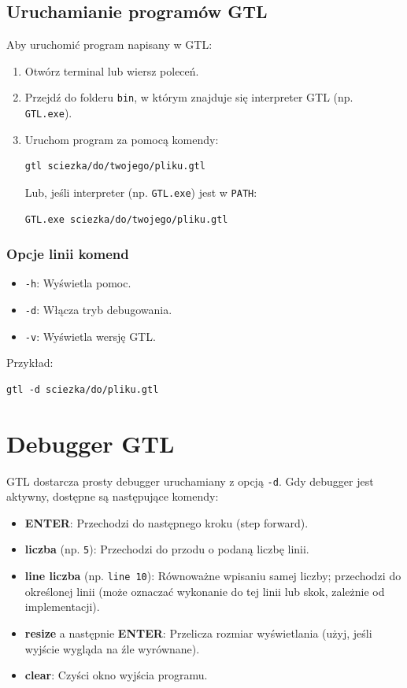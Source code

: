 \documentclass[12pt,a4paper]{article}
\begin{document}
\subsection{Uruchamianie programów GTL}
Aby uruchomić program napisany w GTL:
\begin{enumerate}
    \item Otwórz terminal lub wiersz poleceń.
    \item Przejdź do folderu \texttt{bin}, w którym znajduje się interpreter GTL (np. \texttt{GTL.exe}).
    \item Uruchom program za pomocą komendy:
    \begin{verbatim}
gtl sciezka/do/twojego/pliku.gtl
    \end{verbatim}
    Lub, jeśli interpreter (np. \texttt{GTL.exe}) jest w \texttt{PATH}:
    \begin{verbatim}
GTL.exe sciezka/do/twojego/pliku.gtl
    \end{verbatim}
\end{enumerate}

\subsubsection{Opcje linii komend}
\begin{itemize}
    \item \texttt{-h}: Wyświetla pomoc.
    \item \texttt{-d}: Włącza tryb debugowania.
    \item \texttt{-v}: Wyświetla wersję GTL.
\end{itemize}
Przykład:
\begin{verbatim}
gtl -d sciezka/do/pliku.gtl
\end{verbatim}

\section{Debugger GTL}
\label{app:debugger}
GTL dostarcza prosty debugger uruchamiany z opcją \texttt{-d}. Gdy debugger jest aktywny, dostępne są następujące komendy:

\begin{itemize}
    \item \textbf{ENTER}: Przechodzi do następnego kroku (step forward).
    \item \textbf{liczba} (np. \texttt{5}): Przechodzi do przodu o podaną liczbę linii.
    \item \textbf{line liczba} (np. \texttt{line 10}): Równoważne wpisaniu samej liczby; przechodzi do określonej linii (może oznaczać wykonanie do tej linii lub skok, zależnie od implementacji).
    \item \textbf{resize} a następnie \textbf{ENTER}: Przelicza rozmiar wyświetlania (użyj, jeśli wyjście wygląda na źle wyrównane).
    \item \textbf{clear}: Czyści okno wyjścia programu.
\end{itemize}
\end{document}
